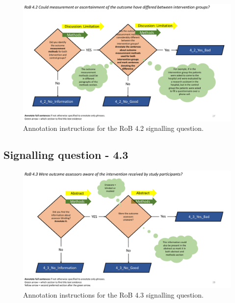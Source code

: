 \documentclass[sn-mathphys,Numbered]{sn-jnl}%
\begin{document}
\begin{figure}[hbt]
    \centering
    \includegraphics[width=\textwidth]{figures/4_2.pdf}
    \caption{Annotation instructions for the RoB 4.2 signalling question.}
    \label{fig:4_2}
\end{figure}
%
%
%
\subsection*{Signalling question - 4.3 }
%
\begin{figure}[hbt]
    \centering
    \includegraphics[width=\textwidth]{figures/4_3.pdf}
    \caption{Annotation instructions for the RoB 4.3 signalling question.}
    \label{fig:4_3}
\end{figure}
%
%
%
\end{document}
